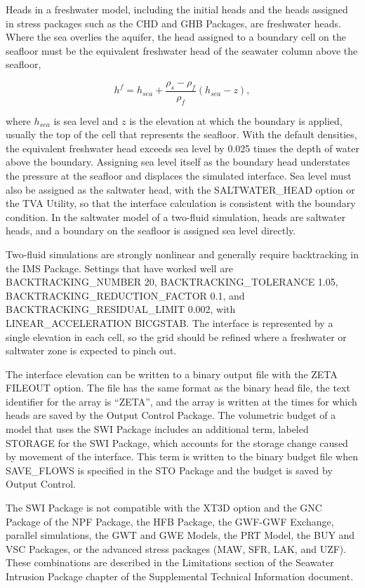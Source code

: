 Heads in a freshwater model, including the initial heads and the heads assigned in stress packages such as the CHD and GHB Packages, are freshwater heads.  Where the sea overlies the aquifer, the head assigned to a boundary cell on the seafloor must be the equivalent freshwater head of the seawater column above the seafloor,

\begin{equation}
h^f = h_{sea} + \frac{\rho_s - \rho_f}{\rho_f} \left( h_{sea} - z \right),
\end{equation}

\noindent where $h_{sea}$ is sea level and $z$ is the elevation at which the boundary is applied, usually the top of the cell that represents the seafloor.  With the default densities, the equivalent freshwater head exceeds sea level by 0.025 times the depth of water above the boundary.  Assigning sea level itself as the boundary head understates the pressure at the seafloor and displaces the simulated interface.  Sea level must also be assigned as the saltwater head, with the SALTWATER\_HEAD option or the TVA Utility, so that the interface calculation is consistent with the boundary condition.  In the saltwater model of a two-fluid simulation, heads are saltwater heads, and a boundary on the seafloor is assigned sea level directly.

Two-fluid simulations are strongly nonlinear and generally require backtracking in the IMS Package.  Settings that have worked well are BACKTRACKING\_NUMBER 20, BACKTRACKING\_TOLERANCE 1.05, BACKTRACKING\_REDUCTION\_FACTOR 0.1, and BACKTRACKING\_RESIDUAL\_LIMIT 0.002, with LINEAR\_ACCELERATION BICGSTAB.  The interface is represented by a single elevation in each cell, so the grid should be refined where a freshwater or saltwater zone is expected to pinch out.

The interface elevation can be written to a binary output file with the ZETA FILEOUT option.  The file has the same format as the binary head file, the text identifier for the array is ``ZETA'', and the array is written at the times for which heads are saved by the Output Control Package.  The volumetric budget of a model that uses the SWI Package includes an additional term, labeled STORAGE for the SWI Package, which accounts for the storage change caused by movement of the interface.  This term is written to the binary budget file when SAVE\_FLOWS is specified in the STO Package and the budget is saved by Output Control.

The SWI Package is not compatible with the XT3D option and the GNC Package of the NPF Package, the HFB Package, the GWF-GWF Exchange, parallel simulations, the GWT and GWE Models, the PRT Model, the BUY and VSC Packages, or the advanced stress packages (MAW, SFR, LAK, and UZF).  These combinations are described in the Limitations section of the Seawater Intrusion Package chapter of the Supplemental Technical Information document.

